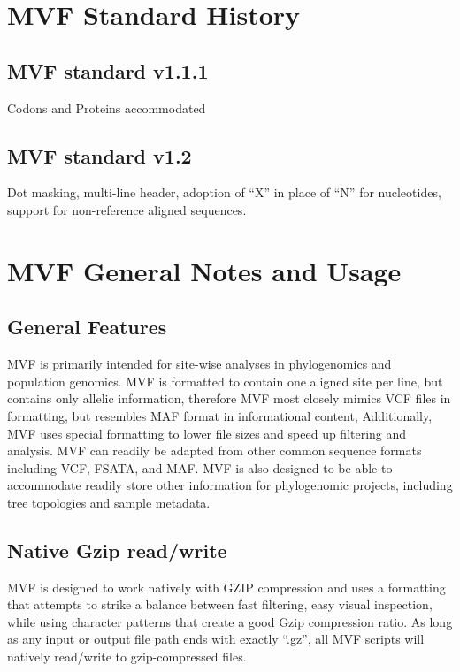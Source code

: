 \documentclass[letterpaper,11pt,english]{sphinxmanual}
\begin{document}
\section{MVF Standard History}
\label{\detokenize{mvf_spec:mvf-standard-history}}

\subsection{MVF standard v1.1.1}
\label{\detokenize{mvf_spec:mvf-standard-v1-1-1}}
Codons and Proteins accommodated


\subsection{MVF standard v1.2}
\label{\detokenize{mvf_spec:mvf-standard-v1-2}}
Dot masking, multi-line header, adoption of “X” in place of “N” for nucleotides, support for non-reference aligned sequences.


\section{MVF General Notes and Usage}
\label{\detokenize{mvf_spec:mvf-general-notes-and-usage}}

\subsection{General Features}
\label{\detokenize{mvf_spec:general-features}}
MVF is primarily intended for site-wise analyses in phylogenomics and population genomics. MVF is formatted to contain one aligned site per line, but contains only allelic information, therefore MVF most closely mimics VCF files in formatting, but resembles MAF format in informational content,  Additionally, MVF uses special formatting to lower file sizes and speed up filtering and analysis.  MVF can readily be adapted from other common sequence formats including VCF, FSATA, and MAF.  MVF is also designed to be able to accommodate readily store other information for phylogenomic projects, including tree topologies and sample metadata.


\subsection{Native Gzip read/write}
\label{\detokenize{mvf_spec:native-gzip-read-write}}
MVF is designed to work natively with GZIP compression and uses a formatting that attempts to strike a balance between fast filtering, easy visual inspection, while using character patterns that create a good Gzip compression ratio. As long as any input or output file path ends with exactly “.gz”, all MVF scripts will natively read/write to gzip-compressed files.
\end{document}
